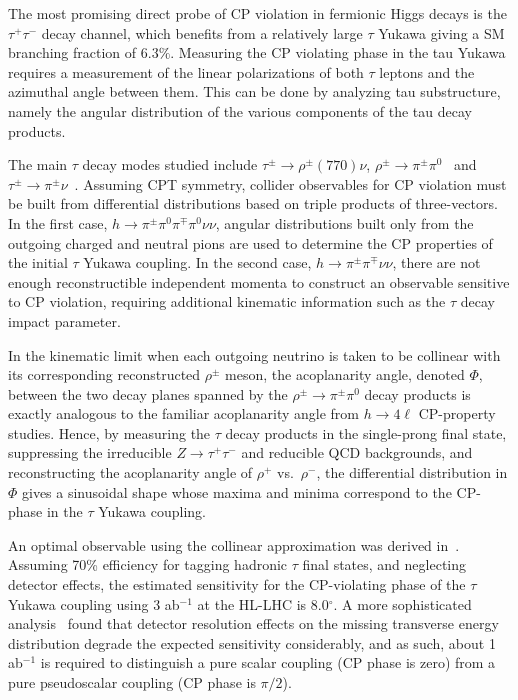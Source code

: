 {

The most promising direct probe of CP violation in fermionic Higgs
decays is the $\tau^+ \tau^-$ decay channel, which benefits from a
relatively large $\tau$ Yukawa giving a SM branching fraction of
$6.3\%$. Measuring the CP violating phase in the tau Yukawa requires a measurement of the linear polarizations of both $\tau$ leptons and the azimuthal angle between them. This can be done by analyzing tau substructure, namely the angular distribution of the various components of the tau decay products.

The main $\tau$ decay modes studied include $\tau^\pm \to
\rho^\pm (770) \nu$, $\rho^\pm \to \pi^\pm \pi^0$~\cite{Bower:2002zx,
  Desch:2003mw, Desch:2003rw, Harnik:2013aja, Askew:2015mda,
  Jozefowicz:2016kvz} and $\tau^\pm \to \pi^\pm
\nu$~\cite{Berge:2008wi, Berge:2008dr, Berge:2011ij}.  Assuming CPT
symmetry, collider observables for CP violation must be built from
differential distributions based on triple products of three-vectors.
In the first case, $h \to \pi^\pm \pi^0 \pi^\mp \pi^0 \nu \nu$,
angular distributions built only from the outgoing charged and neutral
pions are used to determine the CP properties of the initial $\tau$
Yukawa coupling.  In the second case, $h \to \pi^\pm \pi^\mp \nu \nu$,
there are not enough reconstructible independent momenta to construct an observable sensitive to CP violation, requiring additional kinematic information such as the $\tau$ decay impact parameter.

In the kinematic limit when each outgoing neutrino is taken to be
collinear with its corresponding reconstructed $\rho^\pm$ meson, the
acoplanarity angle, denoted $\Phi$, between the two decay planes
spanned by the $\rho^\pm \to \pi^\pm \pi^0$ decay products is exactly
analogous to the familiar acoplanarity angle from $h \to 4 \ell$
CP-property studies.  Hence, by measuring the $\tau$ decay products in
the single-prong final state, suppressing the irreducible $Z \to
\tau^+ \tau^-$ and reducible QCD backgrounds, and reconstructing the
acoplanarity angle of $\rho^+$ vs.~$\rho^-$, the differential
distribution in $\Phi$ gives a sinusoidal shape whose maxima and
minima correspond to the CP-phase in the $\tau$ Yukawa coupling.  

An optimal observable using the collinear approximation was derived in~\cite{Harnik:2013aja}. Assuming 70\% efficiency for tagging hadronic $\tau$ final states, and
neglecting detector effects, the estimated sensitivity for the
CP-violating phase of the $\tau$ Yukawa coupling using 3 ab$^{-1}$ at
the HL-LHC is 8.0$^\circ$.  A more sophisticated
analysis~\cite{Askew:2015mda} found that detector resolution effects
on the missing transverse energy distribution degrade the expected
sensitivity considerably, and as such, about 1 ab$^{-1}$ is required
to distinguish a pure scalar coupling (CP phase is zero) from a pure
pseudoscalar coupling (CP phase is $\pi/2$).

}
